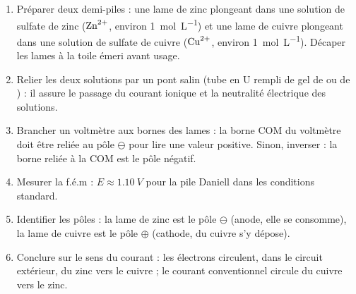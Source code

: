\documentclass[11pt]{article}
\newcommand{\cle}[1]{{\popxbold\color{popdark}#1}}
\begin{document}
\begin{methode}
\begin{enumerate}
\item Préparer deux demi-piles : une lame de \cle{zinc} plongeant dans une solution de sulfate de zinc ($\ce{Zn^2+}$, environ \SI{1}{mol.L^{-1}}) et une lame de \cle{cuivre} plongeant dans une solution de sulfate de cuivre ($\ce{Cu^2+}$, environ \SI{1}{mol.L^{-1}}). Décaper les lames à la toile émeri avant usage.
\item Relier les deux solutions par un \cle{pont salin} (tube en U rempli de gel de  ou de ) : il assure le passage du courant ionique et la neutralité électrique des solutions.
\item Brancher un voltmètre aux bornes des lames : la borne COM du voltmètre doit être reliée au pôle $\ominus$ pour lire une valeur positive. Sinon, inverser : la borne reliée à la COM est le pôle négatif.
\item Mesurer la f.é.m : $E \approx \SI{1,10}{V}$ pour la pile Daniell dans les conditions standard.
\item Identifier les pôles : la lame de \cle{zinc} est le pôle $\ominus$ (anode, elle se consomme), la lame de \cle{cuivre} est le pôle $\oplus$ (cathode, du cuivre s'y dépose).
\item Conclure sur le sens du courant : les électrons circulent, dans le circuit extérieur, du zinc vers le cuivre ; le courant conventionnel circule du cuivre vers le zinc.
\end{enumerate}
\end{methode}
\end{document}
